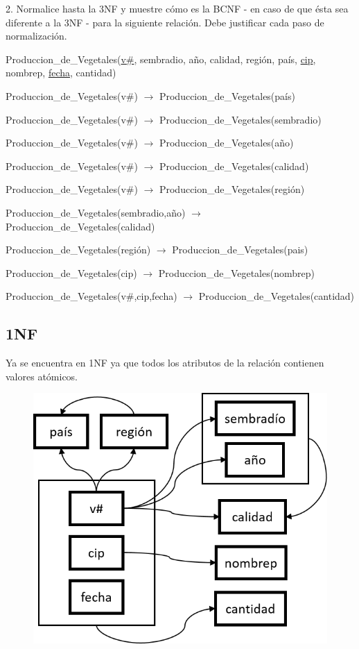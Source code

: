 
2. Normalice hasta la 3NF y muestre cómo es la BCNF - en caso de que ésta sea diferente a la 3NF - para la siguiente relación. Debe justificar cada paso de normalización.

Produccion\_de\_Vegetales(\underline{v\#}, sembradio, año, calidad, región, país, \underline{cip}, nombrep, \underline{fecha}, cantidad)

Produccion\_de\_Vegetales(v\#) $\rightarrow$ Produccion\_de\_Vegetales(país)

Produccion\_de\_Vegetales(v\#) $\rightarrow$ Produccion\_de\_Vegetales(sembradio)

Produccion\_de\_Vegetales(v\#) $\rightarrow$ Produccion\_de\_Vegetales(año)

Produccion\_de\_Vegetales(v\#) $\rightarrow$ Produccion\_de\_Vegetales(calidad)

Produccion\_de\_Vegetales(v\#) $\rightarrow$ Produccion\_de\_Vegetales(región)

Produccion\_de\_Vegetales(sembradio,año) $\rightarrow$ Produccion\_de\_Vegetales(calidad)

Produccion\_de\_Vegetales(región) $\rightarrow$ Produccion\_de\_Vegetales(pais)

Produccion\_de\_Vegetales(cip) $\rightarrow$ Produccion\_de\_Vegetales(nombrep)

Produccion\_de\_Vegetales(v\#,cip,fecha) $\rightarrow$ Produccion\_de\_Vegetales(cantidad)


\subsection*{1NF}
Ya se encuentra en 1NF ya que todos los atributos de la relación contienen valores atómicos.

\begin{figure}[H]
	\centering
	\includegraphics[scale=0.8]{img/1_1nf.png}
\end{figure}

